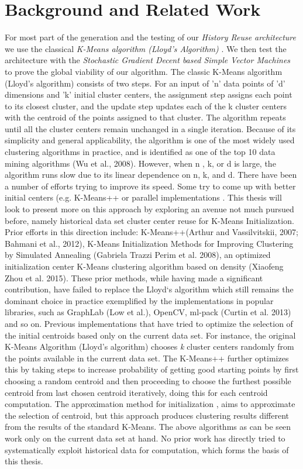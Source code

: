 \section{Background and Related Work}
For most part of the generation and the testing of our \textit{History Reuse architecture} we use the classical \textit{K-Means algorithm (Lloyd's Algorithm)}\cite{kmeans_orig} . We then test the architecture with the \textit{Stochastic Gradient Decent based Simple Vector Machines}\cite{sgd_svm} to prove the global viability of our algorithm.
The classic K-Means algorithm (Lloyd’s algorithm) consists of two steps. For an input of 'n' data points of 'd' dimensions and 'k' initial cluster centers, the assignment step assigns each point to its closest cluster, and the update step updates each of the k cluster centers with the centroid of the points assigned to that cluster. The algorithm repeats until all the cluster centers remain unchanged in a single iteration.
Because of its simplicity and general applicability, the algorithm is one of the most widely used clustering algorithms in practice, and is identified as one of the top 10 data mining algorithms (Wu et al., 2008). However, when n , k, or d is large, the algorithm runs slow due to its linear dependence on n, k, and d. There have been a number of efforts trying to improve its speed. Some try to come up with better initial centers (e.g. K-Means{++} \cite{kmeans++} or parallel implementations \cite{kmens_parellel}. This thesis will look to present more on this approach by exploring an avenue not much pursued before, namely historical data set cluster center reuse for K-Means Initialization. 
Prior efforts in this direction include: K-Means{++}(Arthur and Vassilvitskii, 2007; Bahmani et al., 2012), K-Means Initialization Methods for Improving Clustering by Simulated Annealing (Gabriela Trazzi Perim et al. 2008), an optimized initialization center K-Means clustering algorithm based on density (Xiaofeng Zhou et al. 2015). These prior methods, while having made a significant contribution, have failed to replace the Lloyd`s algorithm which still remains the dominant choice in practice exemplified by the implementations in popular libraries, such as GraphLab (Low et al.), OpenCV, ml-pack (Curtin et al. 2013) and so on.
Previous implementations that have tried to optimize the selection of the initial centroids based only on the current data set. For instance, the original K-Means Algorithm (Lloyd’s algorithm) chooses \textit{k} cluster centers randomly from the points available in the current data set. The K-Means{++} \cite{kmeans++} further optimizes this by taking steps to increase probability of getting good starting points by first choosing a random centroid and then proceeding to choose the furthest possible centroid from last chosen centroid iteratively, doing this for each centroid computation. The approximation method for initialization \cite{approx_meth}, aims to approximate the selection of centroid, but this approach produces clustering results different from the results of the standard K-Means. The above algorithms as can be seen work only on the current data set at hand. No prior work has directly tried to systematically exploit historical data for computation, which forms the basis of this thesis.
